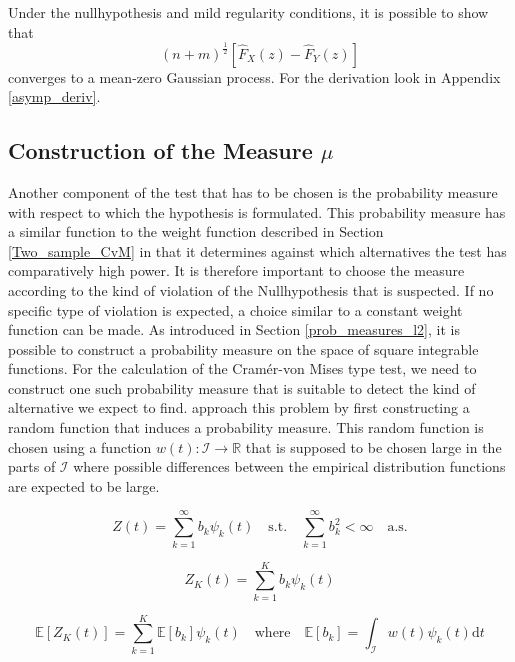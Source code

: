 \documentclass[12pt, a4paper]{article}
\theoremstyle{MAstyle} \newtheorem{assumption}{Assumption}[section]
\theoremstyle{MAstyle} \newtheorem{definition}{Definition}[section]
\theoremstyle{MAstyle} \newtheorem{theorem}{Theorem}[section]
\begin{document}
			Under the nullhypothesis and mild regularity conditions, it is possible to show that 
			\begin{equation}
				(n+m)^{\frac{1}{2}} \left[\hat{F}_X(z) - \hat{F}_Y(z)\right]
			\end{equation}
			converges to a mean-zero Gaussian process. For the derivation look in Appendix \ref{asymp_deriv}.
		
		\subsection{Construction of the Measure $\mu$}\label{mu}
			Another component of the test that has to be chosen is the probability measure with respect to which the hypothesis is formulated. This probability measure has a similar function to the weight function described in Section \ref{Two_sample_CvM} in that it determines against which alternatives the test has comparatively high power. It is therefore important to choose the measure according to the kind of violation of the Nullhypothesis that is suspected. If no specific type of violation is expected, a choice similar to a constant weight function can be made.
			As introduced in Section \ref{prob_measures_l2}, it is possible to construct a probability measure on the space of square integrable functions. For the calculation of the Cram\'{e}r-von Mises type test, we need to construct one such probability measure that is suitable to detect the kind of alternative we expect to find.
			\cite{bugni_permutation_2021} approach this problem by first constructing a random function that induces a probability measure. This random function is chosen using a function $w(t):\mathcal{I} \rightarrow \mathbb{R}$ that is supposed to be chosen large in the parts of $\mathcal{I}$ where possible differences between the empirical distribution functions are expected to be large.
			
			\begin{equation}\label{non_truncated}
				Z(t) = \sum_{k = 1}^{\infty} b_k \psi_k(t)
				\quad \text{s.t.} \quad
				\sum_{k = 1}^{\infty} b_k^2 < \infty \quad \text{a.s.}
			\end{equation}

			\begin{equation}\label{truncation}
				Z_K(t) = \sum_{k = 1}^{K} b_k \psi_k(t)
			\end{equation}
		
			\begin{equation}
				\mathbb{E}\left[Z_K(t)\right] = \sum_{k = 1}^{K} \mathbb{E}\left[b_k\right] \psi_k(t)
				\quad \text{where} \quad
				\mathbb{E}\left[b_k\right] = \int_{\mathcal{I}}w(t)\psi_k(t) \mathrm{d}t
			\end{equation}
		
\end{document}
